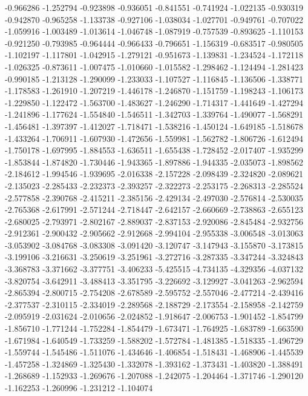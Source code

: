 -0.966286
-1.252794
-0.923898
-0.936051
-0.841551
-0.741924
-1.022135
-0.930319
-0.942870
-0.965258
-1.133738
-0.927106
-1.038034
-1.027701
-0.949761
-0.707022
-1.059916
-1.003489
-1.013614
-1.046748
-1.087919
-0.757539
-0.893625
-1.110153
-0.921250
-0.793985
-0.964444
-0.966433
-0.796651
-1.156319
-0.683517
-0.980505
-1.102197
-1.117801
-1.042915
-1.279121
-0.951673
-1.139831
-1.234524
-1.172118
-1.026325
-0.873611
-1.007475
-1.010660
-1.015582
-1.298462
-1.124494
-1.281423
-0.990185
-1.213128
-1.290099
-1.233033
-1.107527
-1.116845
-1.136506
-1.338771
-1.178583
-1.261910
-1.207219
-1.446178
-1.246870
-1.151759
-1.198243
-1.106173
-1.229850
-1.122472
-1.563700
-1.483627
-1.246290
-1.714317
-1.441649
-1.427294
-1.241896
-1.177624
-1.554840
-1.546511
-1.342703
-1.339764
-1.490077
-1.568291
-1.456481
-1.397397
-1.412027
-1.718471
-1.538216
-1.450124
-1.649185
-1.518678
-1.433264
-1.706911
-1.607930
-1.472656
-1.559981
-1.562782
-1.806726
-1.612494
-1.750178
-1.697995
-1.884553
-1.636511
-1.655438
-1.728452
-2.017407
-1.935299
-1.853844
-1.874820
-1.730446
-1.943365
-1.897886
-1.944335
-2.035073
-1.898562
-2.184612
-1.994546
-1.939695
-2.016338
-2.157228
-2.098439
-2.324820
-2.089621
-2.135023
-2.285433
-2.232373
-2.393257
-2.322273
-2.253175
-2.268313
-2.285524
-2.577858
-2.390768
-2.415211
-2.385156
-2.429134
-2.497030
-2.576814
-2.530035
-2.765368
-2.617991
-2.571244
-2.718447
-2.642157
-2.660669
-2.738863
-2.655123
-2.680025
-2.793971
-2.802167
-2.889037
-2.837153
-2.920086
-2.845484
-2.932756
-2.912361
-2.900432
-2.905662
-2.912668
-2.994104
-2.955338
-3.006548
-3.013063
-3.053902
-3.084768
-3.083308
-3.091420
-3.120747
-3.147943
-3.155870
-3.173815
-3.199106
-3.216631
-3.250619
-3.251961
-3.272716
-3.287335
-3.347244
-3.324843
-3.368783
-3.371662
-3.377751
-3.406233
-5.425515
-4.734135
-4.329356
-4.037132
-3.820754
-3.642911
-3.488413
-3.351795
-3.226692
-3.129927
-3.041263
-2.962594
-2.865394
-2.800715
-2.754208
-2.678589
-2.595752
-2.557046
-2.477214
-2.439416
-2.377537
-2.310115
-2.334019
-2.289568
-2.188729
-2.173554
-2.158958
-2.142759
-2.095919
-2.031624
-2.010656
-2.024852
-1.918647
-2.006753
-1.901452
-1.854799
-1.856710
-1.771244
-1.752284
-1.854479
-1.673471
-1.764925
-1.683789
-1.663590
-1.671984
-1.640549
-1.733259
-1.588202
-1.572784
-1.481385
-1.518335
-1.496729
-1.559744
-1.545486
-1.511076
-1.434646
-1.406854
-1.518431
-1.468906
-1.445539
-1.457258
-1.324869
-1.325430
-1.332078
-1.393162
-1.373431
-1.403820
-1.388491
-1.268689
-1.152933
-1.269676
-1.207088
-1.242075
-1.204464
-1.371746
-1.290120
-1.162253
-1.260996
-1.231212
-1.104074
